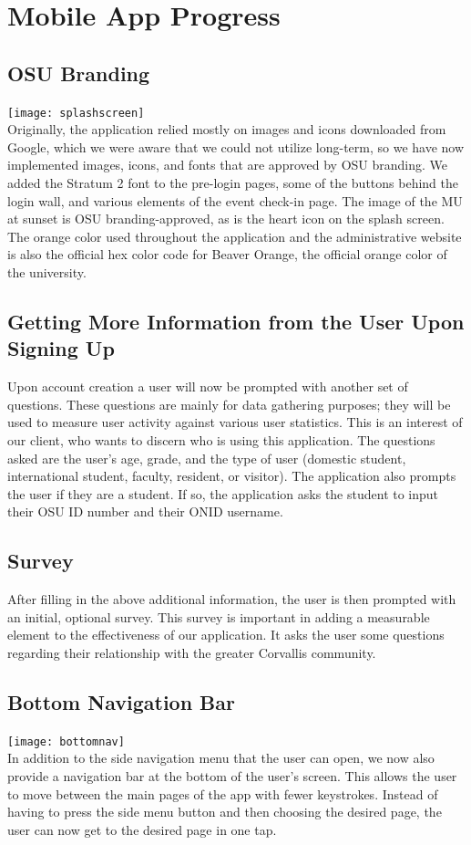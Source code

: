 \documentclass[onecolumn, draftclsnofoot,10pt, compsoc]{IEEEtran}
\begin{document}
\section{Mobile App Progress}
  \subsection{OSU Branding}
    \texttt{[image: splashscreen]} \\
    Originally, the application relied mostly on images and icons downloaded from Google, which we were aware that we could not utilize long-term, so we have now implemented images, icons, and fonts that are approved by OSU branding. We added the Stratum 2 font to the pre-login pages, some of the buttons behind the login wall, and various elements of the event check-in page. The image of the MU at sunset is OSU branding-approved, as is the heart icon on the splash screen. The orange color used throughout the application and the administrative website is also the official hex color code for Beaver Orange, the official orange color of the university.

  \subsection{Getting More Information from the User Upon Signing Up}
    Upon account creation a user will now be prompted with another set of questions. These questions are mainly for data gathering purposes;
    they will be used to measure user activity against various user statistics. This is an interest of our client, who wants to discern who is using this application.
    The questions asked are the user's age, grade, and the type of user (domestic student, international student, faculty, resident, or visitor). The application also prompts
    the user if they are a student. If so, the application asks the student to input their OSU ID number and their ONID username.

  \subsection{Survey}
    After filling in the above additional information, the user is then prompted with an initial, optional survey. This survey is important in adding a measurable element
    to the effectiveness of our application. It asks the user some questions regarding their relationship with the greater Corvallis community.

  \subsection{Bottom Navigation Bar}
    \texttt{[image: bottomnav]} \\
    In addition to the side navigation menu that the user can open, we now also provide a navigation bar at the bottom of the user's screen. This allows
    the user to move between the main pages of the app with fewer keystrokes. Instead of having to press the side menu button and then choosing the desired page, the user can now
    get to the desired page in one tap.
\end{document}
